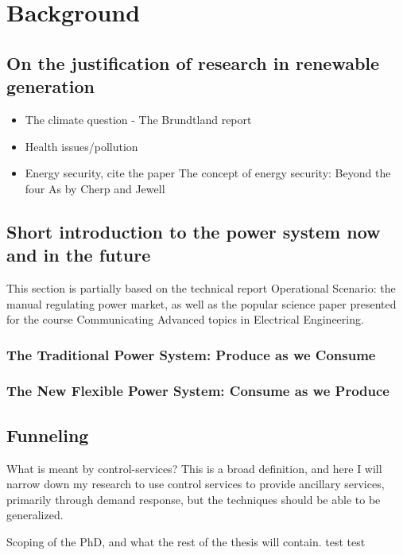 \chapter{Background} %
\label{cha:background}

\section{On the justification of research in renewable generation} %
\label{sec:justification}
\begin{itemize}
	\item The climate question - The Brundtland report
	\item Health issues/pollution
	\item Energy security, cite the paper The concept of energy security: Beyond the four As by Cherp and Jewell
\end{itemize}


\section{Short introduction to the power system now and in the future} %
\label{sec:powsysdesc}
This section is partially based on the technical report Operational Scenario: the manual regulating power market, as well as the popular science paper presented for the course Communicating Advanced topics in Electrical Engineering.
\subsection*{The Traditional Power System: Produce as we Consume}
\label{sub:traditional}

\subsection*{The New Flexible Power System: Consume as we Produce}
\label{sub:future}


\section{Funneling} %
\label{sec:Funneling}
What is meant by control-services? This is a broad definition, and here I will  narrow down my research to use control services to provide ancillary services, primarily through demand response, but the techniques should be able to be generalized.

Scoping of the PhD, and what the rest of the thesis will contain.
test test


